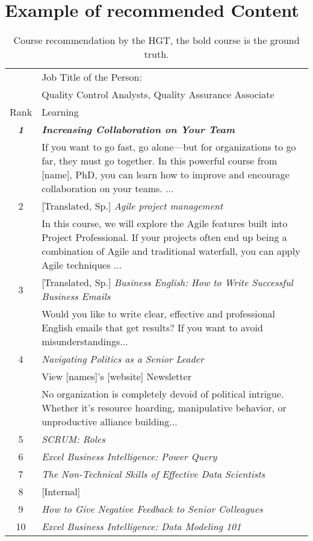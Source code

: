 \chapter{Example of recommended Content}
\label{ch:recommendedcontent}
\begin{table}[htbp]
\centering
\setlength\tabcolsep{3pt}
\begin{tabular}{|c|p{15cm}|}
\hline
& Job Title of the Person:\\
&Quality Control Analysts, Quality Assurance Associate\\
\hline
Rank & Learning \\
\hline
\textbf{\textit{1}} & \textit{\textbf{Increasing Collaboration on Your Team}}\\
  & If you want to go fast, go alone—but for organizations to go far, they must go together. In this powerful course from [name], PhD, you can learn how to improve and encourage collaboration on your teams. ... \\
2 & [Translated, Sp.] \textit{Agile project management}\\
 & In this course, we will explore the Agile features built into Project Professional. If your projects often end up being a combination of Agile and traditional waterfall, you can apply Agile techniques ...\\
3 & [Translated, Sp.] \textit{Business English: How to Write Successful Business Emails}\\
  & Would you like to write clear, effective and professional English emails that get results? If you want to avoid misunderstandings...\\
4 & \textit{Navigating Politics as a Senior Leader} \\
 & View [names]'s [website] Newsletter\\
 & No organization is completely devoid of political intrigue. Whether it's resource hoarding, manipulative behavior, or unproductive alliance building...\\
5 & \textit{SCRUM: Roles} \\
6 & \textit{Excel Business Intelligence: Power Query}\\
7 & \textit{The Non-Technical Skills of Effective Data Scientists} \\
8 & [Internal] \\
9 & \textit{How to Give Negative Feedback to Senior Colleagues}\\
10 & \textit{Excel Business Intelligence: Data Modeling 101}\\
  



\hline
\end{tabular}
\caption[Course recommendation by the HGT]{
Course recommendation by the HGT, the bold course is the ground truth. 
}

\label{tab:content1}
\end{table}

